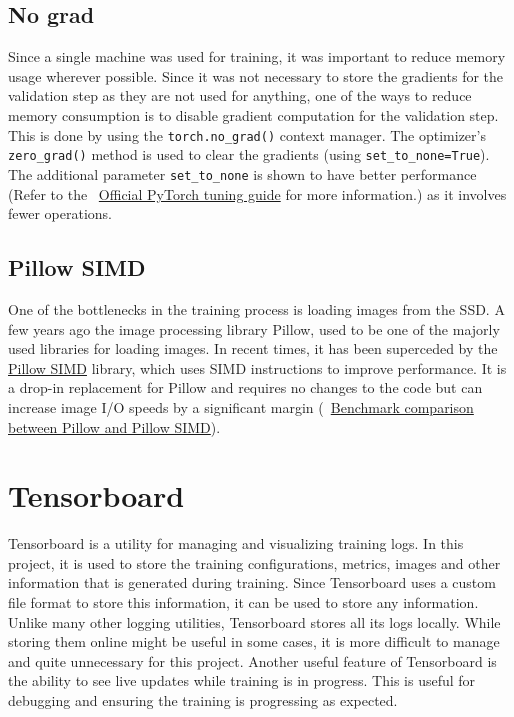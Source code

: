 \subsection{No grad}
Since a single machine was used for training, it was important to reduce memory usage wherever possible. Since it was not necessary to store the gradients for the validation step as they are not used for anything, one of the ways to reduce memory consumption is to disable gradient computation for the validation step. This is done by using the \texttt{torch.no\_grad()} context manager.  The optimizer's \texttt{zero\_grad()} method is used to clear the gradients (using \texttt{set\_to\_none=True}). The additional parameter \texttt{set\_to\_none} is shown to have better performance (Refer to the ~\href{https://pytorch.org/tutorials/recipes/recipes/tuning_guide.html}{Official PyTorch tuning guide} for more information.) as it involves fewer operations.

\subsection{Pillow SIMD}
One of the bottlenecks in the training process is loading images from the SSD. A few years ago the image processing library Pillow, used to be one of the majorly used libraries for loading images. In recent times, it has been superceded by the \href{https://github.com/uploadcare/pillow-simd}{Pillow SIMD} library, which uses SIMD instructions to improve performance. It is a drop-in replacement for Pillow and requires no changes to the code but can increase image I/O speeds by a significant margin (~\href{https://python-pillow.org/pillow-perf/}{Benchmark comparison between Pillow and Pillow SIMD}). 

\section{Tensorboard}
Tensorboard is a utility for managing and visualizing training logs. In this project, it is used to store the training configurations, metrics, images and other information that is generated during training. Since Tensorboard uses a custom file format to store this information, it can be used to store any information. Unlike many other logging utilities, Tensorboard stores all its logs locally. While storing them online might be useful in some cases, it is more difficult to manage and quite unnecessary for this project.
Another useful feature of Tensorboard is the ability to see live updates while training is in progress. This is useful for debugging and ensuring the training is progressing as expected.

